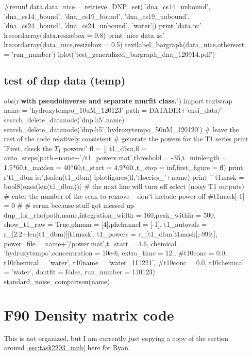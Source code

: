 \begin{python}
#rerun!
data,data_nice = retrieve_DNP_set(['dna_cs14_unbound',
                                            'dna_cs14_bound',
                                            'dna_cs19_bound',
                                            'dna_cs19_unbound',
                                            'dna_cs24_bound',
                                            'dna_cs24_unbound',
                                            'water'])
print 'data is:'
lrecordarray(data,resizebox = 0.8)
print 'nice data is:'
lrecordarray(data_nice,resizebox = 0.5)
textlabel_bargraph(data_nice,othersort = 'run_number')
lplot('test_generalized_bargraph_dna_120914.pdf')
\end{python}

\section{test of dnp data (temp)}
\begin{tiny}
\begin{python}[off]
obs(r'{\bf with pseudoinverse and separate nmrfit class.}')
import textwrap
name = 'hydroxytempo_10uM_120123'
path = DATADIR+'cnsi_data/'
search_delete_datanode('dnp.h5',name)
search_delete_datanode('dnp.h5','hydroxytempo_50uM_120120')
# leave the rest of the code relatively consistent
#{{{ generate the powers for the T1 series
print 'First, check the $T_1$ powers:\n\n'
fl = []
t1_dbm,fl = auto_steps(path+name+'/t1_powers.mat',threshold = -35,t_minlength = 1.5*60,t_maxlen = 40*60,t_start = 4.9*60.,t_stop = inf,first_figure = fl)
print r't1\_dbm is:',lsafen(t1_dbm)
lplotfigures(fl,'t1series_'+name)
print '\n\n'
t1mask = bool8(ones(len(t1_dbm)))
# the next line will turn off select (noisy T1 outputs)
# enter the number of the scan to remove -- don't include power off
#t1mask[-1] = 0
#}}}
# rerun because stuff got messed up
dnp_for_rho(path,name,integration_width = 160,peak_within = 500,
        show_t1_raw = True,phnum = [4],phchannel = [-1],
        t1_autovals = r_[2:2+len(t1_dbm)][t1mask],
        t1_powers = r_[t1_dbm[t1mask],-999.],
        power_file = name+'/power.mat',t_start = 4.6,
        chemical = 'hydroxytempo',concentration = 10e-6,
        extra_time = 12., #t10conc = 0.0, t10chemical = 'water',
        t10name = 'water_111221', #t10conc = 0.0, t10chemical = 'water',
        dontfit = False, run_number = 110123)
standard_noise_comparison(name)
\end{python}
\end{tiny}
\chapter{F90 Density matrix code}
This is not organized, but I am currently just copying a copy of the section around \ref{sec:task2203_innb} here for Ryan.
